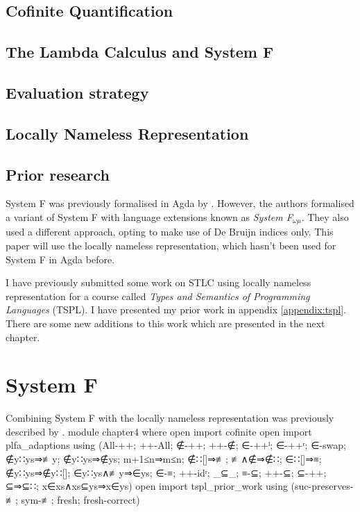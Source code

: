 \documentclass[logo,bsc,singlespacing,parskip,online]{infthesis}
\renewenvironment{code}{\mintedcopy[breaklines,breaksymbolleft=\;]{agda}}{\endmintedcopy}
\begin{document}
\section{Cofinite Quantification}



\section{The Lambda Calculus and System F}


\section{Evaluation strategy}
\label{background:evaluation_strategy}


\section{Locally Nameless Representation}


\section{Prior research}
System F was previously formalised in Agda by \citet{hutton_system_2019}. However, the authors
formalised a variant of System F with language extensions known as \textit{System F$_{\omega \mu}$}.
They also used a different approach, opting to make use of De Bruijn indices only. This paper will
use the locally nameless representation, which hasn't been used for System F in Agda before.

I have previously submitted some work on STLC using locally nameless representation for a course
called \textit{Types and Semantics of Programming Languages} (TSPL). I have presented my prior work
in appendix \ref{appendix:tspl}. There are some new additions to this work which are presented in
the next chapter.

\chapter{System F}
Combining System F with the locally nameless representation was previously described by
\citet{chargueraud_locally_2012}.
\begin{code}
module chapter4 where
  open import cofinite
  open import plfa_adaptions using (All-++; ++-All; ∉-++;
    ++-∉; ∈-++ˡ; ∈-++ʳ; ∈-swap; ∉y∷ys⇒≢y; ∉y∷ys⇒∉ys;
    m+1≤n⇒m≤n; ∉∷[]⇒≢; ≢∧∉⇒∉∷; ∈∷[]⇒≡; ∉y∷ys⇒∉y∷[];
    ∈y∷ys∧≢y⇒∈ys; ∈-≡; ++-idʳ; _⊆_; ≡-⊆; ++-⊆; ⊆-++; ⊆⇒⊆∷;
    x∈xs∧xs⊆ys⇒x∈ys)
  open import tspl_prior_work
    using (suc-preserves-≢; sym-≢; fresh; fresh-correct)
\end{code}
\end{document}
